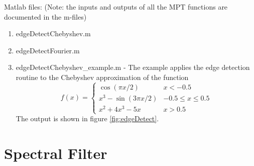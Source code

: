 \documentclass[12pt]{article}
\begin{document}
Matlab files: (Note: the inputs and outputs of all the MPT functions are documented in the m-files)
\begin{enumerate}
    \item edgeDetectChebyshev.m
    \item edgeDetectFourier.m
    \item edgeDetectChebyshev\_example.m - The example applies the
    edge detection routine to the Chebyshev approximation of the
    function
\begin{equation}
 f(x)= \left\{
\begin{array}{ll}
  \cos(\pi x/2) & x < -0.5 \\
  x^3 - \sin(3\pi x/2) & -0.5 \leq x \leq 0.5   \\
  x^2 + 4x^3 - 5x  & x > 0.5
\end{array}
\right. \label{function:2discont}
\end{equation}
     The output is shown in figure  \ref{fig:edgeDetect}.
\end{enumerate}

\section{Spectral Filter}
\end{document}
